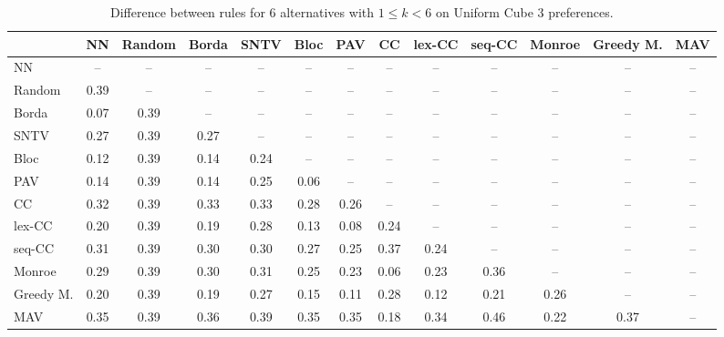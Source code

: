 
\begin{table*}[htbp]
\centering
\begin{tabular}{lcccccccccccc}
\toprule
 & NN & Random & Borda & SNTV & Bloc & PAV & CC & lex-CC & seq-CC & Monroe & Greedy M. & MAV \\
\midrule
NN & -- & -- & -- & -- & -- & -- & -- & -- & -- & -- & -- & -- \\
Random & \cellcolor{blue!39} 0.39 & -- & -- & -- & -- & -- & -- & -- & -- & -- & -- & -- \\
Borda & \cellcolor{blue!7} 0.07 & \cellcolor{blue!39} 0.39 & -- & -- & -- & -- & -- & -- & -- & -- & -- & -- \\
SNTV & \cellcolor{blue!27} 0.27 & \cellcolor{blue!39} 0.39 & \cellcolor{blue!27} 0.27 & -- & -- & -- & -- & -- & -- & -- & -- & -- \\
Bloc & \cellcolor{blue!12} 0.12 & \cellcolor{blue!39} 0.39 & \cellcolor{blue!14} 0.14 & \cellcolor{blue!24} 0.24 & -- & -- & -- & -- & -- & -- & -- & -- \\
PAV & \cellcolor{blue!14} 0.14 & \cellcolor{blue!39} 0.39 & \cellcolor{blue!14} 0.14 & \cellcolor{blue!25} 0.25 & \cellcolor{blue!6} 0.06 & -- & -- & -- & -- & -- & -- & -- \\
CC & \cellcolor{blue!32} 0.32 & \cellcolor{blue!39} 0.39 & \cellcolor{blue!33} 0.33 & \cellcolor{blue!33} 0.33 & \cellcolor{blue!28} 0.28 & \cellcolor{blue!26} 0.26 & -- & -- & -- & -- & -- & -- \\
lex-CC & \cellcolor{blue!20} 0.20 & \cellcolor{blue!39} 0.39 & \cellcolor{blue!19} 0.19 & \cellcolor{blue!28} 0.28 & \cellcolor{blue!13} 0.13 & \cellcolor{blue!8} 0.08 & \cellcolor{blue!24} 0.24 & -- & -- & -- & -- & -- \\
seq-CC & \cellcolor{blue!31} 0.31 & \cellcolor{blue!39} 0.39 & \cellcolor{blue!30} 0.30 & \cellcolor{blue!30} 0.30 & \cellcolor{blue!27} 0.27 & \cellcolor{blue!25} 0.25 & \cellcolor{blue!37} 0.37 & \cellcolor{blue!24} 0.24 & -- & -- & -- & -- \\
Monroe & \cellcolor{blue!28} 0.29 & \cellcolor{blue!39} 0.39 & \cellcolor{blue!30} 0.30 & \cellcolor{blue!31} 0.31 & \cellcolor{blue!25} 0.25 & \cellcolor{blue!23} 0.23 & \cellcolor{blue!6} 0.06 & \cellcolor{blue!23} 0.23 & \cellcolor{blue!36} 0.36 & -- & -- & -- \\
Greedy M. & \cellcolor{blue!20} 0.20 & \cellcolor{blue!39} 0.39 & \cellcolor{blue!19} 0.19 & \cellcolor{blue!27} 0.27 & \cellcolor{blue!15} 0.15 & \cellcolor{blue!11} 0.11 & \cellcolor{blue!28} 0.28 & \cellcolor{blue!12} 0.12 & \cellcolor{blue!21} 0.21 & \cellcolor{blue!26} 0.26 & -- & -- \\
MAV & \cellcolor{blue!35} 0.35 & \cellcolor{blue!39} 0.39 & \cellcolor{blue!36} 0.36 & \cellcolor{blue!39} 0.39 & \cellcolor{blue!35} 0.35 & \cellcolor{blue!35} 0.35 & \cellcolor{blue!18} 0.18 & \cellcolor{blue!34} 0.34 & \cellcolor{blue!46} 0.46 & \cellcolor{blue!22} 0.22 & \cellcolor{blue!37} 0.37 & -- \\
\bottomrule
\end{tabular}

\caption{Difference between rules for 6 alternatives with $1 \leq k < 6$ on Uniform Cube 3 preferences.}
\label{tab:rule_distance_heatmap-m=[6]-pref_dist=euclidean__args__dimensions=3_-_space=uniform_cube}
\end{table*}
    